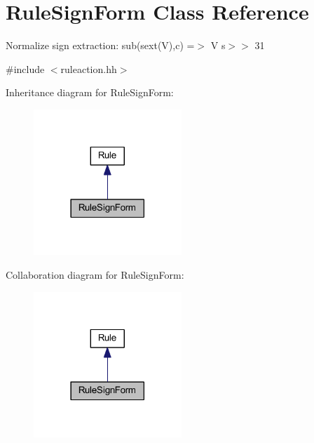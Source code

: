 \hypertarget{class_rule_sign_form}{}\section{Rule\+Sign\+Form Class Reference}
\label{class_rule_sign_form}


Normalize sign extraction\+: {\ttfamily sub(sext(\+V),c) =$>$ V s$>$$>$ 31}  




{\ttfamily \#include $<$ruleaction.\+hh$>$}



Inheritance diagram for Rule\+Sign\+Form\+:
\nopagebreak
\begin{figure}[H]
\begin{center}
\leavevmode
\includegraphics[width=158pt]{class_rule_sign_form__inherit__graph}
\end{center}
\end{figure}


Collaboration diagram for Rule\+Sign\+Form\+:
\nopagebreak
\begin{figure}[H]
\begin{center}
\leavevmode
\includegraphics[width=158pt]{class_rule_sign_form__coll__graph}
\end{center}
\end{figure}
